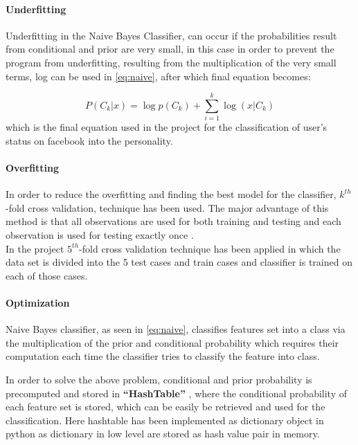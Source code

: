 \paragraph{Underfitting}\hfill

Underfitting \cite{naive} in the Naive Bayes Classifier, can occur if the probabilities result from conditional and prior are very small, in this case in order to prevent the program from underfitting, resulting from the multiplication of the very small terms, log can be used in \ref{eq:naive}, after which final equation becomes:

\begin{equation}
P(C_k|x) = \log p(C_k) + \sum_{i=1}^{k} \log(x|C_k)
\end{equation}
which is the final equation used in the project for the classification of user's status on facebook into the personality.

\paragraph{Overfitting}\hfill

In order to reduce the overfitting and finding the best model for the classifier, $k^{th}$-fold cross validation, technique has been used. The major advantage of this method is that all observations are used for both training and testing and each observation is used for testing exactly once \cite{cross}. \\
In the project $5^{th}$-fold cross validation technique has been applied in which the data set is divided into the 5 test cases and train cases and classifier is trained on each of those cases.

\paragraph{Optimization}\hfill

Naive Bayes classifier, as seen in \ref{eq:naive}, classifies features set into a class via the multiplication of the prior and conditional probability which requires their computation each time the classifier tries to classify the feature into class.

In order to solve the above problem, conditional and prior probability is precomputed and stored in \textbf{``HashTable''} \cite{naive}, where the conditional probability of each feature set is stored, which can be easily be retrieved and used for the classification. Here hashtable has been implemented as dictionary object in python as dictionary in low level are stored as hash value pair in memory.

